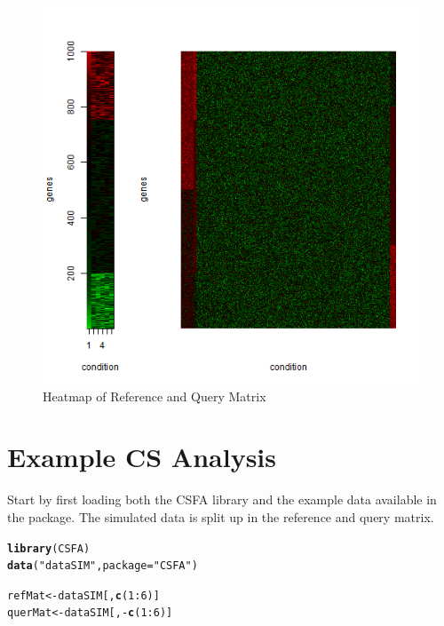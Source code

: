 \documentclass[a4paper]{article}\usepackage[]{graphicx}\usepackage[]{color}
\makeatletter
\def\maxwidth{ %
  \ifdim\Gin@nat@width>\linewidth
    \linewidth
  \else
    \Gin@nat@width
  \fi
}
\newcommand{\hlnum}[1]{\textcolor[rgb]{0.686,0.059,0.569}{#1}}%
\newcommand{\hlstr}[1]{\textcolor[rgb]{0.192,0.494,0.8}{#1}}%
\newcommand{\hlopt}[1]{\textcolor[rgb]{0,0,0}{#1}}%
\newcommand{\hlstd}[1]{\textcolor[rgb]{0.345,0.345,0.345}{#1}}%
\newcommand{\hlkwb}[1]{\textcolor[rgb]{0.69,0.353,0.396}{#1}}%
\newcommand{\hlkwc}[1]{\textcolor[rgb]{0.333,0.667,0.333}{#1}}%
\newcommand{\hlkwd}[1]{\textcolor[rgb]{0.737,0.353,0.396}{\textbf{#1}}}%
\newenvironment{kframe}{%
 \def\at@end@of@kframe{}%
 \ifinner\ifhmode%
  \def\at@end@of@kframe{\end{minipage}}%
  \begin{minipage}{\columnwidth}%
 \fi\fi%
 \def\FrameCommand##1{\hskip\@totalleftmargin \hskip-\fboxsep
 \colorbox{shadecolor}{##1}\hskip-\fboxsep
     \hskip-\linewidth \hskip-\@totalleftmargin \hskip\columnwidth}%
 \MakeFramed {\advance\hsize-\width
   \@totalleftmargin\z@ \linewidth\hsize
   \@setminipage}}%
 {\par\unskip\endMakeFramed%
 \at@end@of@kframe}
\newenvironment{knitrout}{}{} %
\makeatother
\begin{document}
\begin{knitrout}
\color{fgcolor}\begin{figure}[H]

\includegraphics[width=\maxwidth]{figure/data_heatmap-1} \caption[Heatmap of Reference and Query Matrix]{Heatmap of Reference and Query Matrix\label{fig:data_heatmap}}
\end{figure}


\end{knitrout}


\section{Example CS Analysis}
Start by first loading both the CSFA library and the example data available
in the package. The simulated data is split up in the reference and query
matrix.

\begin{knitrout}
\color{fgcolor}\begin{kframe}
\begin{alltt}
        \hlkwd{library}\hlstd{(CSFA)}
        \hlkwd{data}\hlstd{(}\hlstr{"dataSIM"}\hlstd{,}\hlkwc{package}\hlstd{=}\hlstr{"CSFA"}\hlstd{)}

        \hlstd{refMat} \hlkwb{<-} \hlstd{dataSIM[,}\hlkwd{c}\hlstd{(}\hlnum{1}\hlopt{:}\hlnum{6}\hlstd{)]}
        \hlstd{querMat} \hlkwb{<-} \hlstd{dataSIM[,}\hlopt{-}\hlkwd{c}\hlstd{(}\hlnum{1}\hlopt{:}\hlnum{6}\hlstd{)]}
\end{alltt}
\end{kframe}
\end{knitrout}
\end{document}
